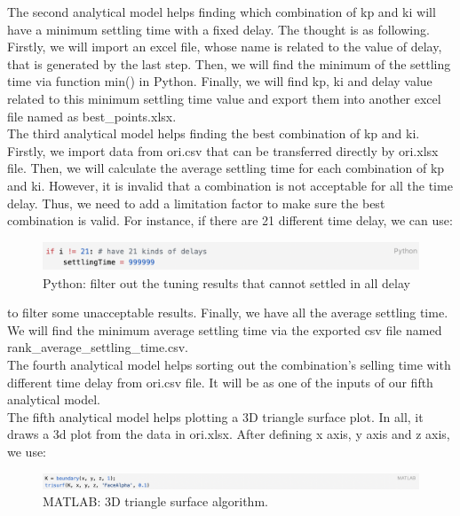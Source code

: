 \documentclass{report}
\begin{document}
The second analytical model helps finding which combination of kp and ki will have a minimum settling time with a fixed delay. The thought is as following. Firstly, we will import an excel file, whose name is related to the value of delay,  that is generated by the last step. Then, we will find the minimum of the settling time via function min() in Python. Finally, we will find kp, ki and delay value related to this minimum settling time value and export them into another excel file named as best\_points.xlsx.\\

The third analytical model helps finding the best combination of kp and ki. Firstly, we import data from ori.csv that can be transferred directly by ori.xlsx file. Then, we will calculate the average settling time for each combination of kp and ki. However, it is invalid that a combination is not acceptable for all the time delay. Thus, we need to add a limitation factor to make sure the best combination is valid. For instance, if there are 21 different time delay, we can use:\\

\begin{figure}[htbp]
\centering
\includegraphics[width = .999\textwidth]{figure/3_4_2_code6.png}
\caption{Python: filter out the tuning results that cannot settled in all delay}
\label{3_4_2_code6}
\end{figure}

to filter some unacceptable results. Finally, we have all the average settling time. We will find the minimum average settling time via the exported csv file named rank\_average\_settling\_time.csv.\\

The fourth analytical model helps sorting out the combination’s selling time with different time delay from ori.csv file. It will be as one of the inputs of our fifth analytical model.\\

The fifth analytical model helps plotting a 3D triangle surface plot. In all, it draws a 3d plot from the data in ori.xlsx. After defining x axis, y axis and z axis, we use:\\

\begin{figure}[htbp]
\centering
\includegraphics[width = .999\textwidth]{figure/3_4_2_code7.png}
\caption{MATLAB: 3D triangle surface algorithm.}
\label{3_4_2_code7}
\end{figure}
\end{document}
